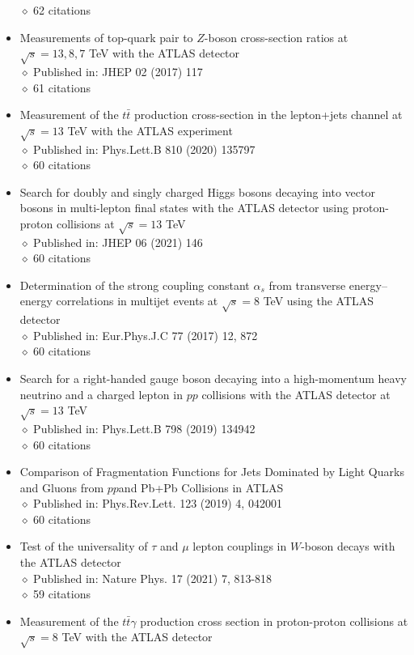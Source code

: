 \documentclass[margin, 10pt]{res} %
\begin{document}
\begin{resume}
\begin{itemize}
$\diamond$ 62 citations
\item Measurements of top-quark pair to $Z$-boson cross-section ratios at $\sqrt{s} = 13, 8, 7$ TeV with the ATLAS detector\\
$\diamond$ Published in: JHEP 02 (2017) 117\\
$\diamond$ 61 citations
\item Measurement of the $t\bar{t}$ production cross-section in the lepton+jets channel at $\sqrt{s} = 13$ TeV with the ATLAS experiment\\
$\diamond$ Published in: Phys.Lett.B 810 (2020) 135797\\
$\diamond$ 60 citations
\item Search for doubly and singly charged Higgs bosons decaying into vector bosons in multi-lepton final states with the ATLAS detector using proton-proton collisions at $\sqrt{s} = 13$ TeV\\
$\diamond$ Published in: JHEP 06 (2021) 146\\
$\diamond$ 60 citations
\item Determination of the strong coupling constant $\alpha_{s}$ from transverse energy–energy correlations in multijet events at $\sqrt{s} = 8$ TeV using the ATLAS detector\\
$\diamond$ Published in: Eur.Phys.J.C 77 (2017) 12, 872\\
$\diamond$ 60 citations
\item Search for a right-handed gauge boson decaying into a high-momentum heavy neutrino and a charged lepton in $pp$ collisions with the ATLAS detector at $\sqrt{s} = 13$ TeV\\
$\diamond$ Published in: Phys.Lett.B 798 (2019) 134942\\
$\diamond$ 60 citations
\item Comparison of Fragmentation Functions for Jets Dominated by Light Quarks and Gluons from $pp$and Pb+Pb Collisions in ATLAS\\
$\diamond$ Published in: Phys.Rev.Lett. 123 (2019) 4, 042001\\
$\diamond$ 60 citations
\item Test of the universality of $\tau$ and $\mu$ lepton couplings in $W$-boson decays with the ATLAS detector\\
$\diamond$ Published in: Nature Phys. 17 (2021) 7, 813-818\\
$\diamond$ 59 citations
\item Measurement of the $t\bar{t}\gamma$ production cross section in proton-proton collisions at $\sqrt{s} = 8$ TeV with the ATLAS detector\\

\end{itemize}
\end{resume}
\end{document}
